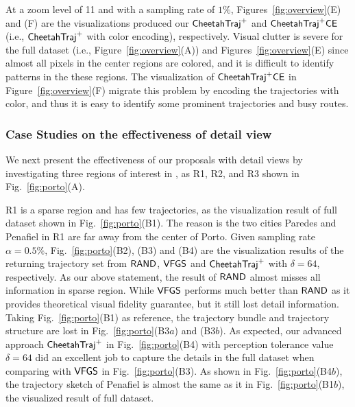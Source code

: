At a zoom level of 11 and with a sampling rate of $1\%$, Figures~\ref{fig:overview}(E) and (F) are the visualizations produced our $\mathsf{CheetahTraj}^{+}$ and $\mathsf{CheetahTraj}^{+}\mathsf{CE}$ (i.e., $\mathsf{CheetahTraj}^{+}$ with color encoding), respectively.
Visual clutter is severe for the full dataset (i.e., Figure~\ref{fig:overview}(A)) and Figures~\ref{fig:overview}(E) since almost all pixels in the center regions are colored, and it is difficult to identify patterns in the these regions. The visualization of $\mathsf{CheetahTraj}^{+}\mathsf{CE}$ in Figure~\ref{fig:overview}(F) migrate this problem by encoding the trajectories with color, and thus it is easy to identify some prominent trajectories and busy routes. 


\subsubsection{Case Studies on the effectiveness of detail view}\label{sec:detail}
We next present the effectiveness of our proposals with detail views by investigating three regions of interest in \pt{}, as R1, R2, and R3 shown in Fig.~\ref{fig:porto}(A).

R1 is a sparse region and has few trajectories, as the visualization result of full \pt{} dataset shown in Fig.~\ref{fig:porto}(B1).
The reason is the two cities Paredes and Penafiel in R1 are far away from the center of Porto.
Given sampling rate $\alpha=0.5\%$, Fig.~\ref{fig:porto}(B2), (B3) and (B4) are the visualization results of the returning trajectory set from $\mathsf{RAND}{}$, $\mathsf{VFGS}$ and $\mathsf{CheetahTraj}^{+}$ with $\delta=64$, respectively.
As our above statement, the result of $\mathsf{RAND}$ almost misses all information in sparse region.
While $\mathsf{VFGS}$ performs much better than $\mathsf{RAND}$ as it provides theoretical visual fidelity guarantee, but it still lost detail information.
Taking Fig.~\ref{fig:porto}(B1) as reference, the trajectory bundle and trajectory structure are lost in Fig.~\ref{fig:porto}(B3$a$) and (B3$b$).
As expected, our advanced approach $\mathsf{CheetahTraj}^{+}$ in Fig.~\ref{fig:porto}(B4) with perception tolerance value $\delta=64$ did an excellent job to capture the details in the full dataset when comparing with $\mathsf{VFGS}$ in Fig.~\ref{fig:porto}(B3).
As shown in Fig.~\ref{fig:porto}(B4$b$), the trajectory sketch of Penafiel is almost the same as it in Fig.~\ref{fig:porto}(B1$b$), the visualized result of full dataset.


